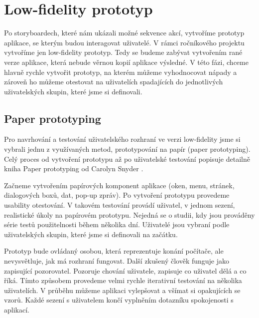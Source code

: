 \chapter{Low-fidelity prototyp}



Po storyboardech, které nám ukázali možné sekvence akcí, vytvoříme prototyp aplikace, se kterým budou interagovat uživatelé. V rámci ročníkového projektu vytvoříme jen low-fidelity prototyp. Tedy se budeme zabývat vytvořením rané verze aplikace, která nebude věrnou kopií aplikace výsledné. V této fázi, chceme hlavně rychle vytvořit prototyp, na kterém můžeme vyhodnocovat nápady a zároveň ho můžeme otestovat na uživatelích spadajících do jednotlivých uživatelských skupin, které jsme si definovali.

\section{Paper prototyping}

Pro navrhování a testování uživatelského rozhraní ve verzi low-fidelity jsme si vybrali jednu z využívaných metod, prototypování na papír (paper prototyping). Celý proces od vytvoření prototypu až po uživatelské testování popisuje detailně kniha Paper prototyping od Carolyn Snyder \cite{Paper_Prototyping}.

Začneme vytvořením papírových komponent aplikace (oken, menu, stránek, dialogových boxů, dat, pop-up zpráv). 
Po vytvoření prototypu provedeme usability otestování.
V takovém testování provádí uživatel, v jednom sezení, realistické úkoly na papírovém prototypu. Nejedná se o studii, kdy jsou prováděny série testů použitelnosti během několika dní. Uživatelé jsou vybraní podle uživatelských skupin, které jsme si definovali na začátku.

Prototyp bude ovládaný osobou, která reprezentuje konání počítače, ale nevysvětluje, jak má rozhraní fungovat. Další zkušený člověk funguje jako zapisující pozorovatel. Pozoruje chování uživatele, zapisuje co uživatel dělá a co říká. Tímto způsobem provedeme velmi rychle iterativní testování na několika uživatelích. V průběhu můžeme aplikaci vylepšovat a všímat si opakujících se vzorů. Každé sezení s uživatelem končí vyplněním dotazníku spokojenosti s aplikací.

